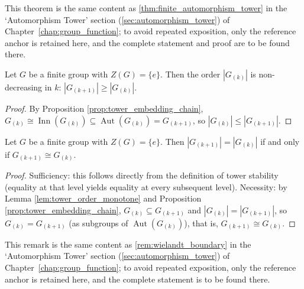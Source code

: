 \begin{theorem}\label{thm:higher_wielandt}
This theorem is the same content as \cref{thm:finite_automorphism_tower} in the `Automorphism Tower' section (\cref{sec:automorphism_tower}) of Chapter~\ref{chap:group_function}; to avoid repeated exposition, only the reference anchor is retained here, and the complete statement and proof are to be found there.
\end{theorem}

\begin{lemma}\label{lem:tower_order_monotone}
Let $G$ be a finite group with $Z(G)=\{e\}$. Then the order $|G_{(k)}|$ is non-decreasing in $k$: $|G_{(k+1)}|\ge |G_{(k)}|$.
\end{lemma}

\begin{proof}
By Proposition \ref{prop:tower_embedding_chain}, $G_{(k)}\cong\operatorname{Inn}(G_{(k)})\subseteq\operatorname{Aut}(G_{(k)})=G_{(k+1)}$, so $|G_{(k)}|\le |G_{(k+1)}|$.
\end{proof}

\begin{corollary}\label{cor:equal_order_stable}
Let $G$ be a finite group with $Z(G)=\{e\}$. Then $|G_{(k+1)}|=|G_{(k)}|$ if and only if $G_{(k+1)}\cong G_{(k)}$.
\end{corollary}

\begin{proof}
Sufficiency: this follows directly from the definition of tower stability (equality at that level yields equality at every subsequent level). Necessity: by Lemma \ref{lem:tower_order_monotone} and Proposition \ref{prop:tower_embedding_chain}, $G_{(k)}\subseteq G_{(k+1)}$ and $|G_{(k)}|=|G_{(k+1)}|$, so $G_{(k)}=G_{(k+1)}$ (as subgroups of $\operatorname{Aut}(G_{(k)})$), that is, $G_{(k+1)}\cong G_{(k)}$.
\end{proof}

\begin{remark}\label{rem:higher_wielandt_boundary}
This remark is the same content as \cref{rem:wielandt_boundary} in the `Automorphism Tower' section (\cref{sec:automorphism_tower}) of Chapter~\ref{chap:group_function}; to avoid repeated exposition, only the reference anchor is retained here, and the complete statement is to be found there.
\end{remark}

